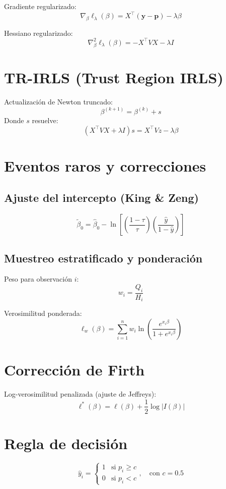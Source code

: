 \documentclass[12pt]{article}
\begin{document}
Gradiente regularizado:
\[
    \nabla_\beta \ell_\lambda(\beta) = X^\top (\mathbf{y} - \mathbf{p}) - \lambda \beta
\]

Hessiano regularizado:
\[
    \nabla^2_\beta \ell_\lambda(\beta) = - X^\top V X - \lambda I
\]

\section*{TR-IRLS (Trust Region IRLS)}
Actualización de Newton truncado:
\[
    \beta^{(k+1)} = \beta^{(k)} + s
\]
Donde $s$ resuelve:
\[
    (X^\top V X + \lambda I) s = X^\top V z - \lambda \beta
\]

\section*{Eventos raros y correcciones}

\subsection*{Ajuste del intercepto (King \& Zeng)}
\[
    \tilde{\beta}_0 = \hat{\beta}_0 - \ln \left[ \left( \frac{1 - \tau}{\tau} \right) \left( \frac{\hat{y}}{1 - \hat{y}} \right) \right]
\]

\subsection*{Muestreo estratificado y ponderación}
Peso para observación $i$:
\[
    w_i = \frac{Q_i}{H_i}
\]

Verosimilitud ponderada:
\[
    \ell_w(\beta) = \sum_{i=1}^n w_i \ln \left( \frac{e^{x_i \beta}}{1 + e^{x_i \beta}} \right)
\]

\section*{Corrección de Firth}

Log-verosimilitud penalizada (ajuste de Jeffreys):
\[
    \ell^*(\beta) = \ell(\beta) + \frac{1}{2} \log |I(\beta)|
\]

\section*{Regla de decisión}

\[
    \hat{y}_i =
    \begin{cases}
        1 & \text{si } p_i \geq c \\
        0 & \text{si } p_i < c
    \end{cases}, \quad \text{con } c = 0.5
\]
\end{document}
